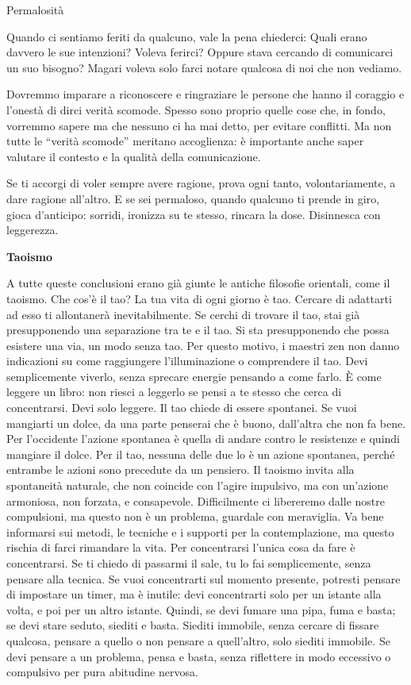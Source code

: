 \documentclass[12pt]{book} %
\begin{document}
\begin{mdframed}[linewidth=1pt]
Permalosità

Quando ci sentiamo feriti da qualcuno, vale la pena chiederci: Quali erano davvero le sue intenzioni?
Voleva ferirci? Oppure stava cercando di comunicarci un suo bisogno? Magari voleva solo farci notare qualcosa di noi che non vediamo.

Dovremmo imparare a riconoscere e ringraziare le persone che hanno il coraggio e l’onestà di dirci verità scomode. Spesso sono proprio quelle cose che, in fondo, vorremmo sapere ma che nessuno ci ha mai detto, per evitare conflitti. Ma non tutte le “verità scomode” meritano accoglienza: è importante anche saper valutare il contesto e la qualità della comunicazione.

Se ti accorgi di voler sempre avere ragione, prova ogni tanto, volontariamente, a dare ragione all’altro.
E se sei permaloso, quando qualcuno ti prende in giro, gioca d’anticipo: sorridi, ironizza su te stesso, rincara la dose. Disinnesca con leggerezza.
\end{mdframed}

\textbf{Taoismo}

A tutte queste conclusioni erano già giunte le antiche filosofie orientali, come il taoismo.
Che cos'è il tao? La tua vita di ogni giorno è tao. Cercare di adattarti ad esso ti allontanerà inevitabilmente. Se cerchi di trovare il tao, stai già presupponendo una separazione tra te e il tao. Si sta presupponendo che possa esistere una via, un modo senza tao. Per questo motivo, i maestri zen non danno indicazioni su come raggiungere l'illuminazione o comprendere il tao. Devi semplicemente viverlo, senza sprecare energie pensando a come farlo. È come leggere un libro: non riesci a leggerlo se pensi a te stesso che cerca di concentrarsi. Devi solo leggere.
Il tao chiede di essere spontanei. Se vuoi mangiarti un dolce, da una parte penserai che è buono, dall'altra che non fa bene. Per l'occidente l'azione spontanea è quella di andare contro le resistenze e quindi mangiare il dolce. Per il tao, nessuna delle due lo è un azione spontanea, perché entrambe le azioni sono precedute da un pensiero. Il taoismo invita alla spontaneità naturale, che non coincide con l’agire impulsivo, ma con un'azione armoniosa, non forzata, e consapevole. Difficilmente ci libereremo dalle nostre compulsioni, ma questo non è un problema, guardale con meraviglia.
Va bene informarsi sui metodi, le tecniche e i supporti per la contemplazione, ma questo rischia di farci rimandare la vita. Per concentrarsi l'unica cosa da fare è concentrarsi. Se ti chiedo di passarmi il sale, tu lo fai semplicemente, senza pensare alla tecnica. Se vuoi concentrarti sul momento presente, potresti pensare di impostare un timer, ma è inutile: devi concentrarti solo per un istante alla volta, e poi per un altro istante. Quindi, se devi fumare una pipa, fuma e basta; se devi stare seduto, siediti e basta. Siediti immobile, senza cercare di fissare qualcosa, pensare a quello o non pensare a quell'altro, solo siediti immobile. Se devi pensare a un problema, pensa e basta, senza riflettere in modo eccessivo o compulsivo per pura abitudine nervosa.
\end{document}
